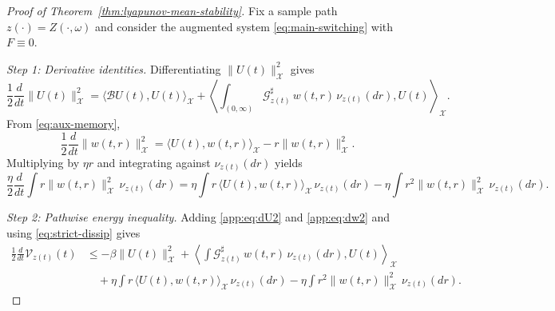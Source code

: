 \documentclass[12pt,a4paper]{article}
\theoremstyle{plain}
\theoremstyle{definition}
\theoremstyle{remark}
\begin{document}
	\begin{proof}[Proof of Theorem~\ref{thm:lyapunov-mean-stability}]
		Fix a sample path $z(\cdot)=Z(\cdot,\omega)$ and consider the augmented system
		\eqref{eq:main-switching} with $F\equiv 0$.
		
		\smallskip\noindent
		\emph{Step 1: Derivative identities.}
		Differentiating $\|U(t)\|_{\mathcal X}^2$ gives
		\begin{equation}
			\label{app:eq:dU2}
			\frac12\frac{d}{dt}\|U(t)\|_{\mathcal X}^2
			=
			\langle \mathcal B U(t),U(t)\rangle_{\mathcal X}
			+
			\left\langle
			\int_{(0,\infty)} \mathcal G^\sharp_{z(t)}\,w(t,r)\,\nu_{z(t)}(dr),
			U(t)\right\rangle_{\mathcal X}.
		\end{equation}
		From \eqref{eq:aux-memory},
		\[
		\frac12\frac{d}{dt}\|w(t,r)\|_{\mathcal X}^2
		=
		\langle U(t),w(t,r)\rangle_{\mathcal X}
		-
		r\|w(t,r)\|_{\mathcal X}^2.
		\]
		Multiplying by $\eta r$ and integrating against $\nu_{z(t)}(dr)$ yields
		\begin{equation}
			\label{app:eq:dw2}
			\frac{\eta}{2}\frac{d}{dt}\int r\|w(t,r)\|_{\mathcal X}^2\,\nu_{z(t)}(dr)
			=
			\eta \int r\,\langle U(t),w(t,r)\rangle_{\mathcal X}\,\nu_{z(t)}(dr)
			-
			\eta \int r^2\|w(t,r)\|_{\mathcal X}^2\,\nu_{z(t)}(dr).
		\end{equation}
		
		\smallskip\noindent
		\emph{Step 2: Pathwise energy inequality.}
		Adding \eqref{app:eq:dU2} and \eqref{app:eq:dw2} and using \eqref{eq:strict-dissip} gives
		\begin{align}
			\label{app:eq:Vprime-pathwise}
			\frac12\frac{d}{dt}\mathcal V_{z(t)}(t)
			&\le
			-\beta\|U(t)\|_{\mathcal X}^2
			+
			\left\langle
			\int \mathcal G^\sharp_{z(t)}\,w(t,r)\,\nu_{z(t)}(dr),
			U(t)\right\rangle_{\mathcal X}\nonumber\\
			&\quad
			+\eta \int r\,\langle U(t),w(t,r)\rangle_{\mathcal X}\,\nu_{z(t)}(dr)
			-
			\eta \int r^2\|w(t,r)\|_{\mathcal X}^2\,\nu_{z(t)}(dr).
		\end{align}
		

\end{proof}
\end{document}
